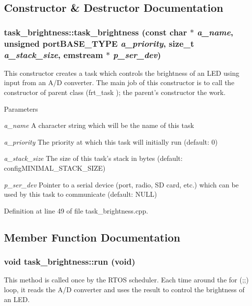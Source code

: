 \subsection{Constructor \& Destructor Documentation}
\hypertarget{classtask__brightness_a5802baf3a0c9fe53ccbce8966d1fad47}{
\subsubsection[{task\_\-brightness}]{\setlength{\rightskip}{0pt plus 5cm}task\_\-brightness::task\_\-brightness (const char $\ast$ {\em a\_\-name}, \/  unsigned portBASE\_\-TYPE {\em a\_\-priority}, \/  size\_\-t {\em a\_\-stack\_\-size}, \/  emstream $\ast$ {\em p\_\-ser\_\-dev})}}
\label{classtask__brightness_a5802baf3a0c9fe53ccbce8966d1fad47}
This constructor creates a task which controls the brightness of an LED using input from an A/D converter. The main job of this constructor is to call the constructor of parent class ({\ttfamily frt\_\-task} ); the parent's constructor the work. 
\begin{DoxyParams}{Parameters}
\item[{\em a\_\-name}]A character string which will be the name of this task \item[{\em a\_\-priority}]The priority at which this task will initially run (default: 0) \item[{\em a\_\-stack\_\-size}]The size of this task's stack in bytes (default: configMINIMAL\_\-STACK\_\-SIZE) \item[{\em p\_\-ser\_\-dev}]Pointer to a serial device (port, radio, SD card, etc.) which can be used by this task to communicate (default: NULL) \end{DoxyParams}


Definition at line 49 of file task\_\-brightness.cpp.

\subsection{Member Function Documentation}
\hypertarget{classtask__brightness_a615beac07a99f0856f048a46fd9a3898}{
\subsubsection[{run}]{\setlength{\rightskip}{0pt plus 5cm}void task\_\-brightness::run (void)}}
\label{classtask__brightness_a615beac07a99f0856f048a46fd9a3898}
This method is called once by the RTOS scheduler. Each time around the for (;;) loop, it reads the A/D converter and uses the result to control the brightness of an LED. 

